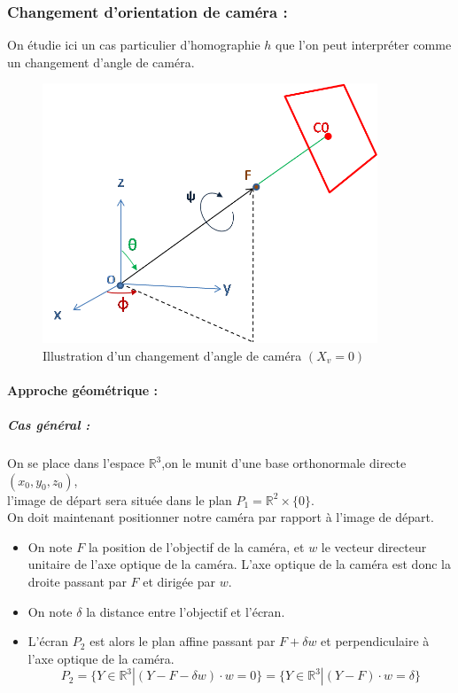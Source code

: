 







\subsubsection{Changement d'orientation de caméra :}
On étudie ici un cas particulier d'homographie $h$   que l'on peut interpréter comme un changement d'angle de caméra.\\
\begin{figure}[h!]
\centering
\includegraphics[width=10cm]{shema_decomp.png}
\caption{Illustration d'un changement d'angle de caméra $(X_v =0)$}
\end{figure}

\paragraph{Approche géométrique :}
\subparagraph{Cas général :}
On se place dans l'espace $\mathbb{R}^{3}$,on le munit d'une base orthonormale directe $(x_{0},y_{0},z_{0})$,\\ l'image de départ sera située dans le plan $P_{1}= \mathbb{R}^{2}\times \{0\}$.\\
On doit maintenant positionner notre caméra par rapport à l'image de départ.
\begin{itemize}
\item On note $F$ la position de l'objectif de la caméra, et $w$ le vecteur directeur unitaire de l'axe optique de la caméra. L'axe optique de la caméra est donc la droite passant par $F$ et dirigée par $w$.
\item On note $\delta$ la distance entre l'objectif et l'écran.
\item L'écran $P_{2}$ est alors le plan affine passant par $F+\delta w$ et perpendiculaire à l'axe optique de la caméra.
\begin{equation*}
P_{2}=\{Y\in \mathbb{R}^{3}|(Y-F-\delta w)\cdot w=0\}=\{Y\in \mathbb{R}^{3}|(Y-F)\cdot w=\delta\}
\end{equation*}
\end{itemize}


